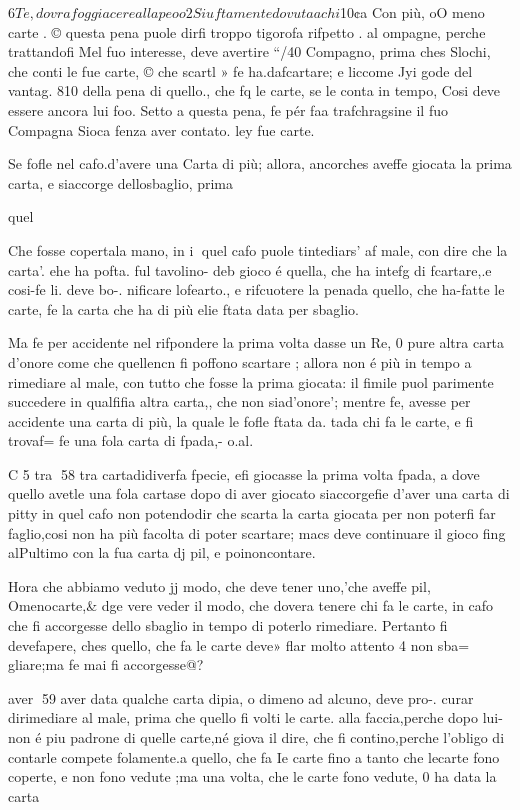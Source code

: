 \documentclass[11pt,a6paper]{article}
\begin{document}
 

 
$6

Te, dovra foggiacere alla peoo

2 Siuftamente dovuta a chi
$10¢a Con più, oO meno carte .
© questa pena puole dirfi
troppo tigorofa rifpetto . al
ompagne, perche trattandofi
Mel fuo interesse, deve avertire
“/40 Compagno, prima ches
Slochi, che conti le fue carte,
© che scartl » fe ha.dafcartare;
e liccome Jyi gode del vantag.
810 della pena di quello., che fq
le carte, se le conta in tempo,
Cosi deve essere ancora lui foo.
Setto a questa pena, fe pér faa
trafchragsine il fuo Compagna
Sioca fenza aver contato. ley
fue carte.

Se fofle nel cafo.d’avere una
Carta di più; allora, ancorches
aveffe giocata la prima carta,
e siaccorge dellosbaglio, prima

quel

Che fosse copertala mano, in i
quel cafo puole tintediars’ af
male, con dire che la carta’.
ehe ha pofta. ful tavolino- deb
gioco é quella, che ha intefg
di fcartare,.e cosi-fe li. deve bo-.
nificare lofearto., e rifcuotere
la penada quello, che ha-fatte
le carte, fe la carta che ha di
più elie ftata data per sbaglio.

Ma fe per accidente nel rifpondere la prima volta dasse un
Re, 0 pure altra carta d’onore
come che quellencn fi poffono scartare ; allora non é più in
tempo a rimediare al male, con
tutto che fosse la prima giocata:
il fimile puol parimente succedere in qualfifia altra carta,,
che non siad’onore’; mentre fe,
avesse per accidente una carta
di più, la quale le fofle ftata da.
tada chi fa le carte, e fi trovaf=
fe una fola carta di fpada,- o.al.

C 5 tra
58
tra cartadidiverfa fpecie, efi
giocasse la prima volta fpada, a
dove quello avetle una fola cartase dopo di aver giocato siaccorgefie d’aver una carta di pitty
in quel cafo non potendodir che
scarta la carta giocata per non
poterfi far faglio,cosi non ha più
facolta di poter scartare; macs
deve continuare il gioco fing
alPultimo con la fua carta dj
pil, e poinoncontare.

Hora che abbiamo veduto jj
modo, che deve tener uno,'che
aveffe pil, Omenocarte,& dge
vere veder il modo, che dovera tenere chi fa le carte, in cafo
che fi accorgesse dello sbaglio
in tempo di poterlo rimediare.
Pertanto fi devefapere, ches
quello, che fa le carte deve»
flar molto attento 4 non sba=
gliare;ma fe mai fi accorgesse@?

aver
59
aver data qualche carta dipia,
o dimeno ad alcuno, deve pro-.
curar dirimediare al male, prima che quello fi volti le carte.
alla faccia,perche dopo lui-non
é piu padrone di quelle carte,né
giova il dire, che fi contino,perche l’obligo di contarle compete folamente.a quello, che fa Ie
carte fino a tanto che lecarte
fono coperte, e non fono vedute ;ma una volta, che le carte
fono vedute, 0 ha data la carta
\end{document}
